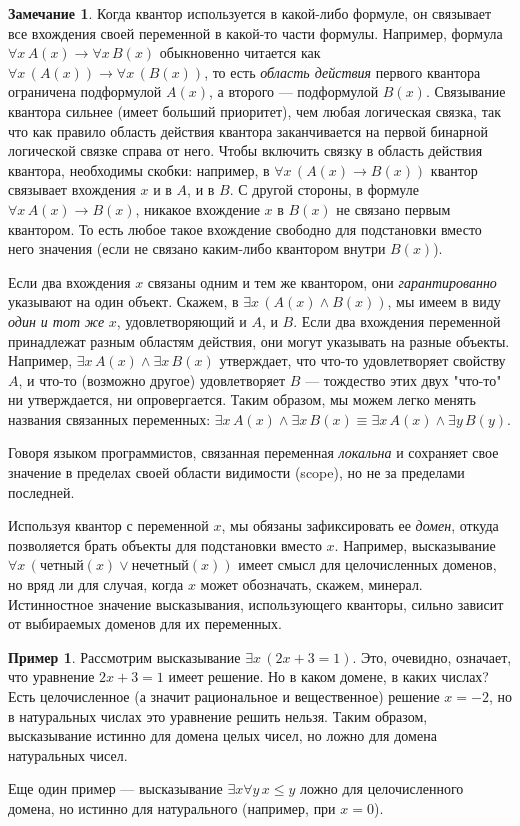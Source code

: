 \documentclass[12pt,notitlepage]{article}
\theoremstyle{plain}
\theoremstyle{definition}
\newtheorem{exm}[thm]{Пример}
\newtheorem{rem}[thm]{Замечание}
\theoremstyle{plain}
\newcommand{\1}{\mathbf{1}}
\newcommand{\0}{\mathbf{0}}
\begin{document}
\begin{rem}
	Когда квантор используется в какой-либо формуле, он связывает все вхождения своей переменной в какой-то части формулы. Например, формула $\forall x\, A(x) \to \forall x\, B(x)$ обыкновенно читается как $\forall x\, ( A(x) ) \to \forall x\, ( B(x) )$, то есть \emph{область действия} первого квантора ограничена подформулой $A(x)$, а второго --- подформулой $B(x)$. Связывание квантора сильнее (имеет больший приоритет), чем любая логическая связка, так что как правило область действия квантора заканчивается на первой бинарной логической связке справа от него. Чтобы включить связку в область действия квантора, необходимы скобки: например, в $\forall x\, (A (x) \to B(x))$ квантор связывает вхождения $x$ и в $A$, и в $B$. С другой стороны, в формуле $\forall x\, A(x) \to B(x)$, никакое вхождение $x$ в $B(x)$ не связано первым квантором. То есть любое такое вхождение свободно для подстановки вместо него значения (если не связано каким-либо квантором внутри $B(x)$).
	
	Если два вхождения $x$ связаны одним и тем же квантором, они \emph{гарантированно} указывают на один объект. Скажем, в $\exists x\, (A(x) \wedge B(x))$, мы имеем в виду \emph{один и тот же} $x$, удовлетворяющий и $A$, и $B$. Если два вхождения переменной принадлежат разным областям действия, они могут указывать на разные объекты. Например, $\exists x\, A(x) \wedge \exists x\, B(x)$ утверждает, что что-то удовлетворяет свойству $A$, и что-то (возможно другое) удовлетворяет $B$ --- тождество этих двух "что-то" ни утверждается, ни опровергается. Таким образом, мы можем легко менять названия связанных переменных: $\exists x\, A(x) \wedge \exists x\, B(x) \equiv \exists x\, A(x) \wedge \exists y\, B(y)$.
	
	Говоря языком программистов, связанная переменная \emph{локальна} и сохраняет свое значение в пределах своей области видимости (scope), но не за пределами последней.
\end{rem}

Используя квантор с переменной $x$, мы обязаны зафиксировать ее \emph{домен}, откуда позволяется брать объекты для подстановки вместо $x$. Например, высказывание $\forall x\, ( \text{четный}(x) \vee \text{нечетный}(x))$ имеет смысл для целочисленных доменов, но вряд ли для случая, когда $x$ может обозначать, скажем, минерал. Истинностное значение высказывания, использующего кванторы, сильно зависит от выбираемых доменов для их переменных.

\begin{exm}
	Рассмотрим высказывание $\exists x\, (2 x + 3 = 1)$. Это, очевидно, означает, что уравнение $2x + 3 = 1$ имеет решение. Но в каком домене, в каких числах? Есть целочисленное (а значит рациональное и вещественное) решение $x = -2$, но в натуральных числах это уравнение решить нельзя. Таким образом, высказывание истинно для домена целых чисел, но ложно для домена натуральных чисел.
	
	Еще один пример --- высказывание $\exists x \forall y\, x \leq y$ ложно для целочисленного домена, но истинно для натурального (например, при $x = 0$).
\end{exm}
\end{document}
